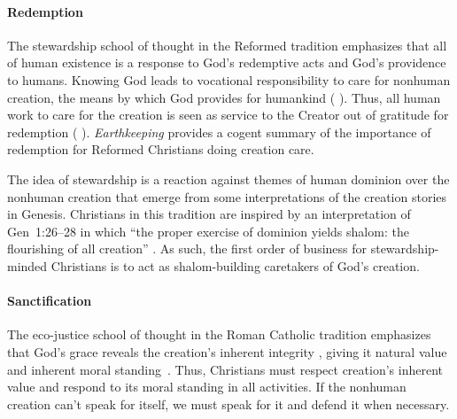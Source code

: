 \documentclass[12pt]{article}
\begin{document}
\paragraph{Redemption} 
\label{sec:redemption}

The stewardship school of thought in the Reformed tradition
emphasizes that all of human existence
is a response to God's redemptive acts
and God's providence to humans.
Knowing God leads to vocational responsibility 
to care for nonhuman creation,
the means by which God provides for humankind  %
(\textcite{Jenkins:2008} \textcite[19]{Jenkins:2008}). 
Thus, all human work to care for the creation 
is seen as service to the Creator
out of gratitude for redemption (\textcite{Jenkins:2008} \textcite[77]{Jenkins:2008}).
\emph{Earthkeeping} \autocite{Wilkenson:1980aa} provides a cogent summary
of the importance of redemption for Reformed Christians doing creation care.

The idea of stewardship is a reaction against themes of human dominion over the nonhuman creation
that emerge from some interpretations of the creation stories in Genesis.
Christians in this tradition are inspired by an interpretation of Gen~1:26–28 in which 
``the proper exercise of dominion yields shalom: the flourishing of all creation'' \autocite{BoumaPrediger:2019}.
As such, the first order of business for stewardship-minded Christians
is to act as shalom-building caretakers of God's creation.

\paragraph{Sanctification} 
\label{sec:sanctification}

The eco-justice school of thought in the Roman Catholic tradition
emphasizes that God's grace reveals the creation's 
inherent integrity \autocite[19]{Jenkins:2008}, 
giving it natural value and inherent moral standing~\autocite{Joldersma:2019}. 
Thus, Christians must respect creation's inherent value and 
respond to its moral standing in all activities.
If the nonhuman creation can't speak for itself, 
we must speak for it and defend it when necessary.
\end{document}
